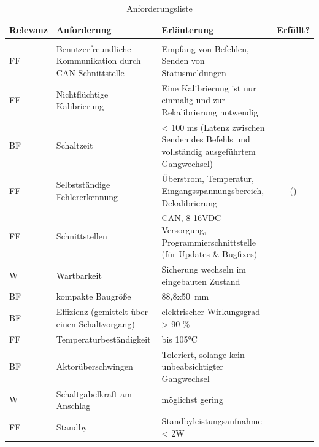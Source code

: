 \begin{table}[h]
	\centering
		\begin{tabular}{l|p{5cm}|p{7cm}|c}
			\textbf{Relevanz} & \textbf{Anforderung} & \textbf{Erläuterung} & Erfüllt?\\ \hline
			& &\\
			FF & Benutzerfreundliche Kommunikation durch CAN Schnittstelle & Empfang von Befehlen, Senden von Statusmeldungen & \checkmark\\ \hline
			FF & Nichtflüchtige Kalibrierung & Eine Kalibrierung ist nur einmalig und zur Rekalibrierung notwendig& \checkmark\\ \hline
			BF & Schaltzeit & < 100 ms (Latenz zwischen Senden des Befehls und vollständig ausgeführtem Gangwechsel)& \checkmark\\ \hline
			FF & Selbstständige Fehlererkennung & Überstrom, Temperatur, Eingangsspannungsbereich, Dekalibrierung& (\checkmark) \\ \hline
			FF & Schnittstellen & CAN, 8-16VDC Versorgung, Programmierschnittstelle (für Updates \& Bugfixes)& \checkmark \\ \hline
			W & Wartbarkeit & Sicherung wechseln im eingebauten Zustand& \checkmark\\ \hline
			BF & kompakte Baugröße & 88,8x\SI{50}{mm}&\checkmark \\ \hline
			BF & Effizienz (gemittelt über einen Schaltvorgang) & elektrischer Wirkungsgrad > 90 \% & \\ \hline
			FF & Temperaturbeständigkeit & bis 105°C& \checkmark \\ \hline
			BF & Aktorüberschwingen & Toleriert, solange kein unbeabsichtigter Gangwechsel& \checkmark
			\\ \hline
			W & Schaltgabelkraft am Anschlag & möglichst gering& \checkmark \\ \hline
			FF & Standby & Standbyleistungsaufnahme < 2W& \checkmark \\ \hline
		\end{tabular}
	\caption{Anforderungsliste}
	\label{tab:Anforderungsliste2}
\end{table}
